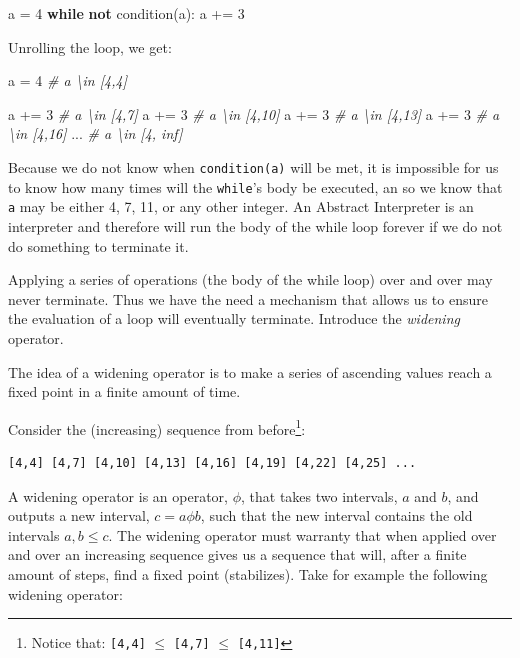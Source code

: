 \documentclass[
11pt, %
english, %
singlespacing, %
headsepline, %
]{MastersDoctoralThesis} %
\newenvironment{Shaded}{}{}
\newcommand{\CommentTok}[1]{\textcolor[rgb]{0.38,0.63,0.69}{\textit{#1}}}
\newcommand{\ControlFlowTok}[1]{\textcolor[rgb]{0.00,0.44,0.13}{\textbf{#1}}}
\newcommand{\DecValTok}[1]{\textcolor[rgb]{0.25,0.63,0.44}{#1}}
\newcommand{\KeywordTok}[1]{\textcolor[rgb]{0.00,0.44,0.13}{\textbf{#1}}}
\newcommand{\NormalTok}[1]{#1}
\newcommand{\OperatorTok}[1]{\textcolor[rgb]{0.40,0.40,0.40}{#1}}
\begin{document}
\begin{Shaded}
\begin{Highlighting}[]
\NormalTok{a }\OperatorTok{=} \DecValTok{4}
\ControlFlowTok{while} \KeywordTok{not}\NormalTok{ condition(a):}
\NormalTok{  a }\OperatorTok{+=} \DecValTok{3}
\end{Highlighting}
\end{Shaded}

Unrolling the loop, we get:

\begin{Shaded}
\begin{Highlighting}[]
\NormalTok{a }\OperatorTok{=} \DecValTok{4}     \CommentTok{# a \textbackslash{}in [4,4]}

\NormalTok{  a }\OperatorTok{+=} \DecValTok{3}  \CommentTok{# a \textbackslash{}in [4,7]}
\NormalTok{  a }\OperatorTok{+=} \DecValTok{3}  \CommentTok{# a \textbackslash{}in [4,10]}
\NormalTok{  a }\OperatorTok{+=} \DecValTok{3}  \CommentTok{# a \textbackslash{}in [4,13]}
\NormalTok{  a }\OperatorTok{+=} \DecValTok{3}  \CommentTok{# a \textbackslash{}in [4,16]}
\NormalTok{  ...}
  \CommentTok{# a \textbackslash{}in [4, inf]}
\end{Highlighting}
\end{Shaded}

Because we do not know when \texttt{condition(a)} will be met, it is
impossible for us to know how many times will the \texttt{while}'s body
be executed, an so we know that \texttt{a} may be either 4, 7, 11, or
any other integer. An Abstract Interpreter is an interpreter and
therefore will run the body of the while loop forever if we do not do
something to terminate it.

Applying a series of operations (the body of the while loop) over and
over may never terminate. Thus we have the need a mechanism that allows
us to ensure the evaluation of a loop will eventually terminate.
Introduce the \emph{widening} operator.

The idea of a widening operator is to make a series of ascending values
reach a fixed point in a finite amount of time.

Consider the (increasing) sequence from before\footnote{Notice that:
  \texttt{{[}4,4{]}} \(\le\) \texttt{{[}4,7{]}} \(\le\)
  \texttt{{[}4,11{]}}}:

\begin{verbatim}
[4,4] [4,7] [4,10] [4,13] [4,16] [4,19] [4,22] [4,25] ...
\end{verbatim}

A widening operator is an operator, \(\phi{}\), that takes two
intervals, \(a\) and \(b\), and outputs a new interval,
\(c = a \phi b\), such that the new interval contains the old intervals
\(a, b \le c\). The widening operator must warranty that when applied
over and over an increasing sequence gives us a sequence that will,
after a finite amount of steps, find a fixed point (stabilizes). Take
for example the following widening operator:
\end{document}
